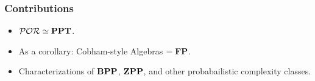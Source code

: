 \documentclass[xcolor={x11names}]{beamer}
\begin{document}
\begin{frame}
\frametitle{Contributions}


\medskip
\begin{itemize}
\item $\mathcal{POR}\simeq \mathbf{PPT}$.
\item As a corollary: Cobham-style Algebras $= \mathbf{FP}$.
\item Characterizations of $\mathbf{BPP}$, $\mathbf{ZPP}$, and other probabailistic complexity classes.
\end{itemize}

\end{frame}
\end{document}
